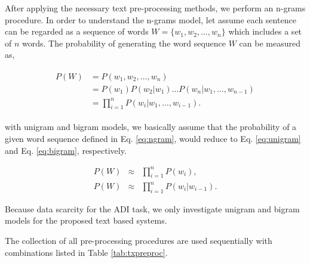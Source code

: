 \documentclass{article}
\begin{document}
After applying the necessary text pre-processing methods, we perform an n-grams procedure. In order to understand the n-grams model, let assume each sentence can be regarded as a sequence of words $W=\{w_1, w_2, \ldots , w_n\}$ which includes a set of $n$ words. The probability of generating the word sequence $W$ can be measured as,

\vspace*{-5pt}
\begin{eqnarray}
\label{eq:ngram}
\begin{split}
P(W) &= P(w_1, w_2, \ldots, w_n) \\
     &= P(w_1)P(w_2|w_1) \ldots P(w_n|w_1, \ldots, w_{n-1}) \\
     &= \prod_{i=1}^{n} P(w_i|w_1, \ldots, w_{i-1}).
\end{split}
\end{eqnarray}

\noindent with unigram and bigram models, we basically assume that the probability of a given word sequence defined in Eq. \ref{eq:ngram}, would reduce to Eq. \ref{eq:unigram} and Eq. \ref{eq:bigram}, respectively.

\vspace*{-5pt}
\begin{eqnarray}
P(W) &\approx& \prod_{i=1}^{n} P(w_i) \label{eq:unigram}, \\
P(W) &\approx& \prod_{i=1}^{n} P(w_i|w_{i-1}). \label{eq:bigram}
\end{eqnarray}


\noindent Because data scarcity for the ADI task, we only investigate unigram and bigram models for the proposed text based systems. 

The collection of all pre-processing procedures are used sequentially with combinations listed in Table \ref{tab:txpreproc}.

\vspace{-6pt}
\begin{table}[h]\caption{Combination of ADI text pre-processing methods. Second and third columns indicate application of stop-word removal and stemming, where the fourth column indicates `Y': bigram and `N': unigram.}\label{tab:txpreproc}
\vspace{5pt}
\centering
{}
\end{table}
\end{document}
